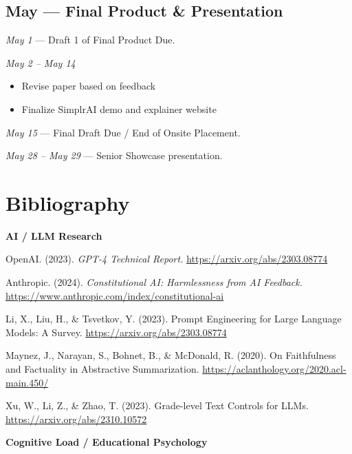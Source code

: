 \documentclass[11pt]{article}
\begin{document}
\subsection*{May --- Final Product \& Presentation}

\textit{May 1} --- Draft 1 of Final Product Due.

\textit{May 2 -- May 14}
\begin{itemize}[leftmargin=1.6em,nosep]
  \item Revise paper based on feedback
  \item Finalize SimplrAI demo and explainer website
\end{itemize}

\textit{May 15} --- Final Draft Due / End of Onsite Placement.

\textit{May 28 -- May 29} --- Senior Showcase presentation.

\section*{Bibliography}

\textbf{AI / LLM Research}

\begin{list}{}{%
  \setlength{\leftmargin}{1.5em}
  \setlength{\itemindent}{-1.5em}
  \setlength{\itemsep}{0.3em}
}
\item OpenAI. (2023). \textit{GPT-4 Technical Report.}
\url{https://arxiv.org/abs/2303.08774}
\item Anthropic. (2024). \textit{Constitutional AI: Harmlessness from AI
Feedback.} \url{https://www.anthropic.com/index/constitutional-ai}
\item Li, X., Liu, H., \& Tsvetkov, Y. (2023). Prompt Engineering for Large
Language Models: A Survey. \url{https://arxiv.org/abs/2303.08774}
\item Maynez, J., Narayan, S., Bohnet, B., \& McDonald, R. (2020). On
Faithfulness and Factuality in Abstractive Summarization.
\url{https://aclanthology.org/2020.acl-main.450/}
\item Xu, W., Li, Z., \& Zhao, T. (2023). Grade-level Text Controls for LLMs.
\url{https://arxiv.org/abs/2310.10572}
\end{list}

\textbf{Cognitive Load / Educational Psychology}
\end{document}
